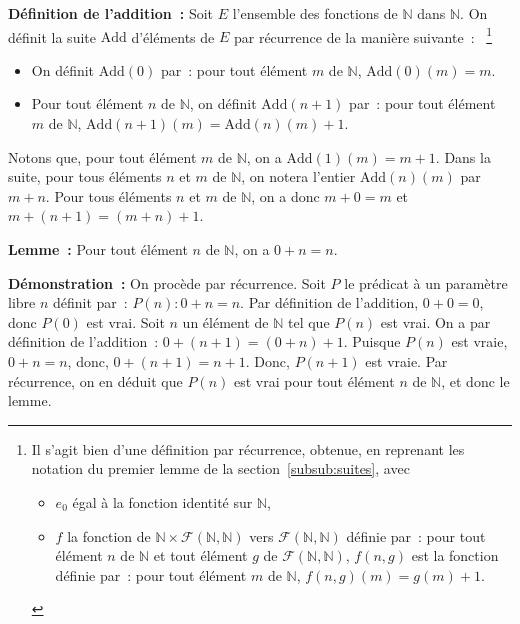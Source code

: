 \noindent\textbf{Définition de l'addition :} Soit $E$ l'ensemble des fonctions de $\mathbb{N}$ dans $\mathbb{N}$. 
    On définit la suite $\mathrm{Add}$ d'éléments de $E$ par récurrence de la manière suivante :%
    ~\footnote{
        Il s'agit bien d'une définition par récurrence, obtenue, en reprenant les notation du premier lemme de la section~\ref{subsub:suites}, avec
        \begin{itemize}[nosep]
            \item $e_0$ égal à la fonction identité sur $\mathbb{N}$,
            \item $f$ la fonction de $\mathbb{N} \times \mathcal{F}(\mathbb{N},\mathbb{N})$ vers $\mathcal{F}(\mathbb{N},\mathbb{N})$ définie par : pour tout élément $n$ de $\mathbb{N}$ et tout élément $g$ de $\mathcal{F}(\mathbb{N},\mathbb{N})$, $f(n,g)$ est la fonction définie par : pour tout élément $m$ de $\mathbb{N}$, $f(n,g)(m) = g(m) + 1$.
        \end{itemize}
    }
    \begin{itemize}[nosep]
        \item On définit $\mathrm{Add}(0)$ par : pour tout élément $m$ de $\mathbb{N}$, $\mathrm{Add}(0)(m) = m$.
        \item Pour tout élément $n$ de $\mathbb{N}$, on définit $\mathrm{Add}(n+1)$ par : pour tout élément $m$ de $\mathbb{N}$, $\mathrm{Add}(n+1)(m) = \mathrm{Add}(n)(m) + 1$.
    \end{itemize}
    Notons que, pour tout élément $m$ de $\mathbb{N}$, on a $\mathrm{Add}(1)(m) = m + 1$. 
    Dans la suite, pour tous éléments $n$ et $m$ de $\mathbb{N}$, on notera l'entier $\mathrm{Add}(n)(m)$ par $m+n$. 
    Pour tous éléments $n$ et $m$ de $\mathbb{N}$, on a donc $m+0=m$ et $m+(n+1) = (m+n)+1$.

\medskip

\noindent\textbf{Lemme :} Pour tout élément $n$ de $\mathbb{N}$, on a $0+n=n$. 

\medskip

\noindent\textbf{Démonstration :} On procède par récurrence. 
    Soit $P$ le prédicat à un paramètre libre $n$ définit par : $P(n): 0+n=n$. 
    Par définition de l'addition, $0+0=0$, donc $P(0)$ est vrai.
    Soit $n$ un élément de $\mathbb{N}$ tel que $P(n)$ est vrai. 
    On a par définition de l'addition : $0+(n+1) = (0+n)+1$. 
    Puisque $P(n)$ est vraie, $0+n=n$, donc, $0+(n+1) = n+1$. 
    Donc, $P(n+1)$ est vraie. 
    Par récurrence, on en déduit que $P(n)$ est vrai pour tout élément $n$ de $\mathbb{N}$, et donc le lemme.

